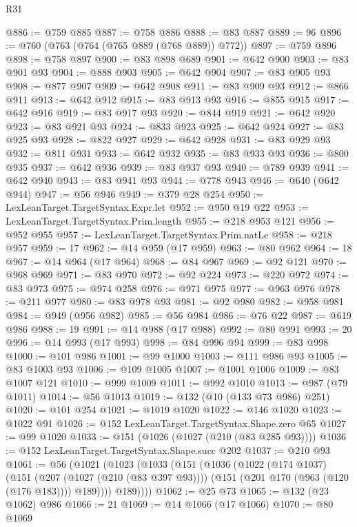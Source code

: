 \begin{lexlean}{R31}
\begin{coremodule}
@886 := @759 @885
@887 := @758 @886
@888 := @83 @887
@889 := 96
@896 := @760 (@763 (@764 (@765 @889 (@768 @889)) @772))
@897 := @759 @896
@898 := @758 @897
@900 := @83 @898 @689
@901 := @642 @900
@903 := @83 @901 @93
@904 := @888 @903
@905 := @642 @904
@907 := @83 @905 @93
@908 := @877 @907
@909 := @642 @908
@911 := @83 @909 @93
@912 := @866 @911
@913 := @642 @912
@915 := @83 @913 @93
@916 := @855 @915
@917 := @642 @916
@919 := @83 @917 @93
@920 := @844 @919
@921 := @642 @920
@923 := @83 @921 @93
@924 := @833 @923
@925 := @642 @924
@927 := @83 @925 @93
@928 := @822 @927
@929 := @642 @928
@931 := @83 @929 @93
@932 := @811 @931
@933 := @642 @932
@935 := @83 @933 @93
@936 := @800 @935
@937 := @642 @936
@939 := @83 @937 @93
@940 := @789 @939
@941 := @642 @940
@943 := @83 @941 @93
@944 := @778 @943
@946 := @640 (@642 @944)
@947 := @56 @946
@949 := @379 @28 @254
@950 := LexLeanTarget.TargetSyntax.Expr.let
@952 := @950 @19 @22
@953 := LexLeanTarget.TargetSyntax.Prim.length
@955 := @218 @953 @121
@956 := @952 @955
@957 := LexLeanTarget.TargetSyntax.Prim.natLe
@958 := @218 @957
@959 := 17
@962 := @14 @959 (@17 @959)
@963 := @80 @962
@964 := 18
@967 := @14 @964 (@17 @964)
@968 := @84 @967
@969 := @92 @121
@970 := @968 @969
@971 := @83 @970
@972 := @92 @224
@973 := @220 @972
@974 := @83 @973
@975 := @974 @258
@976 := @971 @975
@977 := @963 @976
@978 := @211 @977
@980 := @83 @978 @93
@981 := @92 @980
@982 := @958 @981
@984 := @949 (@956 @982)
@985 := @56 @984
@986 := @76 @22
@987 := @619 @986
@988 := 19
@991 := @14 @988 (@17 @988)
@992 := @80 @991
@993 := 20
@996 := @14 @993 (@17 @993)
@998 := @84 @996 @94
@999 := @83 @998
@1000 := @101 @986
@1001 := @99 @1000
@1003 := @111 @986 @93
@1005 := @83 @1003 @93
@1006 := @109 @1005
@1007 := @1001 @1006
@1009 := @83 @1007 @121
@1010 := @999 @1009
@1011 := @992 @1010
@1013 := @987 (@79 @1011)
@1014 := @56 @1013
@1019 := @132 (@10 (@133 @73 @986) @251)
@1020 := @101 @254
@1021 := @1019 @1020
@1022 := @146 @1020
@1023 := @1022 @91
@1026 := @152 LexLeanTarget.TargetSyntax.Shape.zero @65
@1027 := @99 @1020
@1033 := @151 (@1026 (@1027 (@210 (@83 @285 @93))))
@1036 := @152 LexLeanTarget.TargetSyntax.Shape.succ @202
@1037 := @210 @93
@1061 := @56
    (@1021
      (@1023
        (@1033
          (@151
            (@1036
              (@1022
                (@174 @1037)
                (@151
                  (@207 (@1027 (@210 (@83 @397 @93))))
                  (@151 (@201 @170 (@963 (@120 (@176 @183)))) @189))))
            @189))))
@1062 := @25 @73
@1065 := @132 (@23 @1062) @986
@1066 := 21
@1069 := @14 @1066 (@17 @1066)
@1070 := @80 @1069

\end{coremodule}
\end{lexlean}
